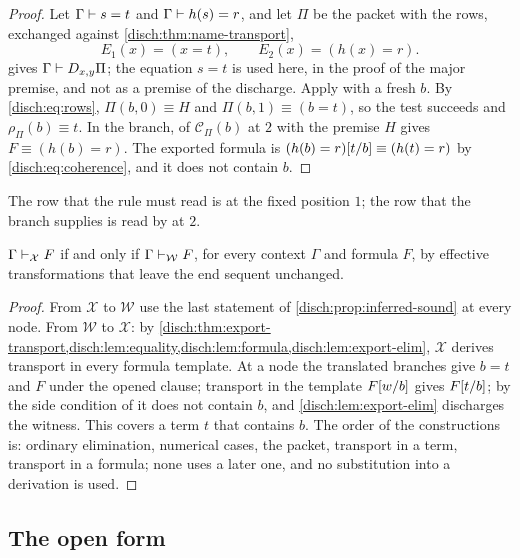 \begin{proof}
Let $\Gamma\vdash s=t$ and $\Gamma\vdash h(s)=r$, and let $\Pi$ be the
packet with the rows, exchanged against \cref{disch:thm:name-transport},
\[
 E_1(x)=(x=t),\qquad E_2(x)=(h(x)=r).
\]
 gives $\Gamma\vdash D_{x,y}\Pi$; the equation
$s=t$ is used here, in the proof of the major premise, and not as a
premise of the discharge. Apply  with a fresh $b$. By
\eqref{disch:eq:rows}, $\Pi(b,0)\equiv H$ and $\Pi(b,1)\equiv(b=t)$, so
the test succeeds and $\rho_\Pi(b)\equiv t$. In the branch, 
of $\mathcal C_\Pi(b)$ at $2$ with the premise $H$ gives
$F\equiv(h(b)=r)$. The exported formula is
$(h(b)=r)[t/b]\equiv(h(t)=r)$ by \eqref{disch:eq:coherence}, and it
does not contain $b$.
\end{proof}

The row that the rule must read is at the fixed position $1$; the row that
the branch supplies is read by  at $2$.

\begin{theorem}
\label{disch:thm:export}
$\Gamma\vdash_{\mathcal X}F$ if and only if $\Gamma\vdash_{\mathcal W}F$,
for every context $\Gamma$ and formula $F$, by effective transformations
that leave the end sequent unchanged.
\end{theorem}

\begin{proof}
From $\mathcal X$ to $\mathcal W$ use the last statement of
\cref{disch:prop:inferred-sound} at every  node. From
$\mathcal W$ to $\mathcal X$: by
\cref{disch:thm:export-transport,disch:lem:equality,disch:lem:formula,disch:lem:export-elim},
$\mathcal X$ derives transport in every formula template. At a
 node the translated branches give $b=t$ and $F$ under the
opened clause; transport in the template $F[w/b]$ gives
$F[t/b]$; by the side condition of  it does not
contain $b$, and \cref{disch:lem:export-elim} discharges the witness. This
covers a term $t$ that contains $b$. The order of the constructions is:
ordinary elimination, numerical cases, the packet, transport in a term,
transport in a formula; none uses a later one, and no substitution into a
derivation is used.
\end{proof}

\subsection{The open form}

